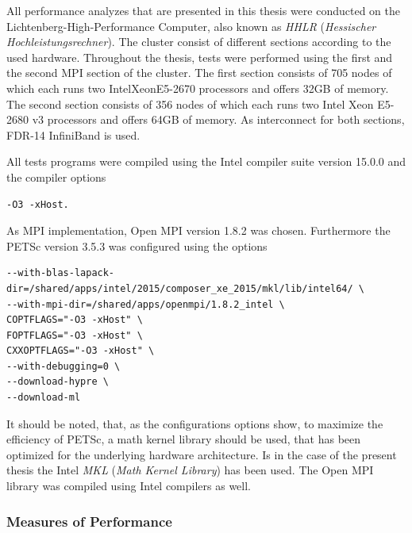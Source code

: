 All performance analyzes that are presented in this thesis were conducted on the Lichtenberg-High-Performance Computer, also known as \emph{HHLR} (\emph{Hessischer Hochleistungsrechner}). The cluster consist of different sections according to the used hardware. Throughout the thesis, tests were performed using the first and the second MPI section of the cluster. The first section consists of 705 nodes of which each runs two Intel\textregistered Xeon\textregistered E5-2670 processors and offers 32GB of memory. The second section consists of 356 nodes of which each runs two Intel Xeon E5-2680 v3 processors and offers 64GB of memory. As interconnect for both sections, FDR-14 InfiniBand is used.

All tests programs were compiled using the Intel compiler suite version 15.0.0 and the compiler options
\begin{lstlisting}
-O3 -xHost.
\end{lstlisting}
As MPI implementation, Open MPI version 1.8.2 was chosen. Furthermore the PETSc version 3.5.3 was configured using the options
\begin{lstlisting}
--with-blas-lapack-dir=/shared/apps/intel/2015/composer_xe_2015/mkl/lib/intel64/ \
--with-mpi-dir=/shared/apps/openmpi/1.8.2_intel \
COPTFLAGS="-O3 -xHost" \
FOPTFLAGS="-O3 -xHost" \
CXXOPTFLAGS="-O3 -xHost" \
--with-debugging=0 \
--download-hypre \
--download-ml
\end{lstlisting}
It should be noted, that, as the configurations options show, to maximize the efficiency of PETSc, a math kernel library should be used, that has been optimized for the underlying hardware architecture. Is in the case of the present thesis the Intel \emph{MKL} (\emph{Math Kernel Library}) has been used. The Open MPI library was compiled using Intel compilers as well.

\subsubsection{Measures of Performance}

